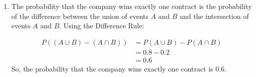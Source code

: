 \begin{solution}
\begin{enumerate}[label=(\alph*)]
        Therefore, the probability that the company wins neither contract is 0.2.

        \item The probability that the company wins exactly one contract is the probability of the difference between the union of events $A$ and $B$ and the intersection of events $A$ and $B$. Using the Difference Rule:

            \begin{align*}
                P((A \cup B) - (A \cap B)) &= P(A \cup B) - P(A \cap B) \\
                                            &= 0.8 - 0.2 \\
                                            &= 0.6
            \end{align*}
            So, the probability that the company wins exactly one contract is 0.6.
            \end{enumerate}
\leavevmode\end{solution}


